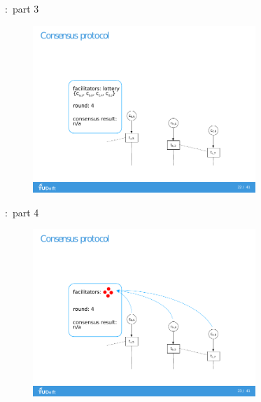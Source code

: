 \documentclass{beamer}
\begin{document}
\begin{frame}[noframenumbering]{\subsecname:~part 3}
  \begin{figure}[h]
  \includegraphics[trim={2cm 1.5cm 2cm 1.5cm},clip,width=0.75\textwidth]{trustchain-3}
  \centering
  \end{figure}
\end{frame}

\begin{frame}[noframenumbering]{\subsecname:~part 4}
  \begin{figure}[h]
  \includegraphics[trim={2cm 1.5cm 2cm 1.5cm},clip,width=0.75\textwidth]{trustchain-4}
  \centering
  \end{figure}
\end{frame}
\end{document}
